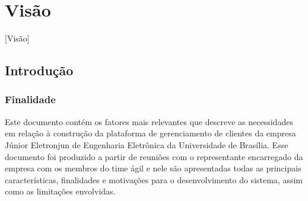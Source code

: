 \chapter{Visão}[Visão]
  \section{Introdução}
    \subsection{Finalidade}
      Este documento contém os fatores mais relevantes que descreve as necessidades em relação à construção da plataforma de gerenciamento de clientes da empresa Júnior Eletronjun de Engenharia Eletrônica da Universidade de Brasília. Esse documento foi produzido a partir de reuniões com o representante encarregado da empresa com os membros do time ágil e nele são apresentadas todas as principais características, finalidades e motivações para o desenvolvimento do sistema, assim como as limitações envolvidas. 
